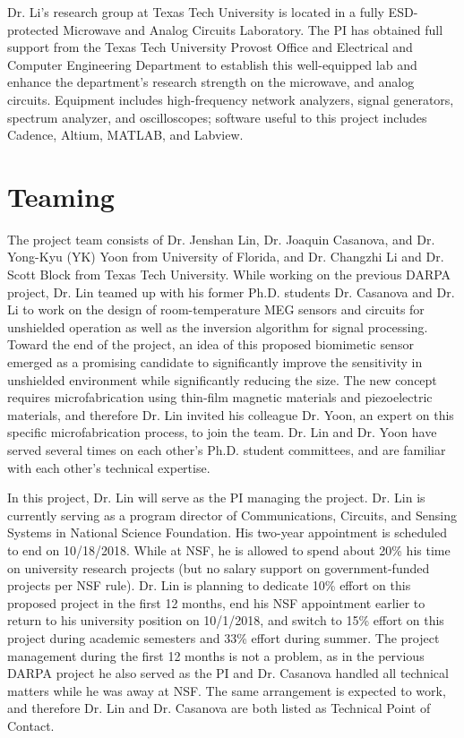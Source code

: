 Dr. Li's research group at Texas Tech University is located in a fully ESD-protected Microwave and Analog Circuits Laboratory. The PI has obtained full support from the Texas Tech University Provost Office and Electrical and Computer Engineering Department to establish this well-equipped lab and enhance the department’s research strength on the microwave, and analog circuits. Equipment includes high-frequency network analyzers, signal generators, spectrum analyzer, and oscilloscopes; software useful to this project includes Cadence, Altium, MATLAB, and Labview.

\section{Teaming}
The project team consists of Dr. Jenshan Lin, Dr. Joaquin Casanova, and Dr. Yong-Kyu (YK) Yoon from University of Florida, and Dr. Changzhi Li and Dr. Scott Block from Texas Tech University. While working on the previous DARPA project, Dr. Lin teamed up with his former Ph.D. students Dr. Casanova and Dr. Li to work on the design of room-temperature MEG sensors and circuits for unshielded operation as well as the inversion algorithm for signal processing. Toward the end of the project, an idea of this proposed biomimetic sensor emerged as a promising candidate to significantly improve the sensitivity in unshielded environment while significantly reducing the size. The new concept requires microfabrication using thin-film magnetic materials and piezoelectric materials, and therefore Dr. Lin invited his colleague Dr. Yoon, an expert on this specific microfabrication process, to join the team. Dr. Lin and Dr. Yoon have served several times on each other's Ph.D. student committees, and are familiar with each other’s technical expertise.

In this project, Dr. Lin will serve as the PI managing the project. Dr. Lin is currently serving as a program director of Communications, Circuits, and Sensing Systems in National Science Foundation. His two-year appointment is scheduled to end on 10/18/2018. While at NSF, he is allowed to spend about 20\% his time on university research projects (but no salary support on government-funded projects per NSF rule). Dr. Lin is planning to dedicate 10\% effort on this proposed project in the first 12 months, end his NSF appointment earlier to return to his university position on 10/1/2018, and switch to 15\% effort on this project during academic semesters and 33\% effort during summer. The project management during the first 12 months is not a problem, as in the pervious DARPA project he also served as the PI and Dr. Casanova handled all technical matters while he was away at NSF. The same arrangement is expected to work, and therefore Dr. Lin and Dr. Casanova are both listed as Technical Point of Contact. 

